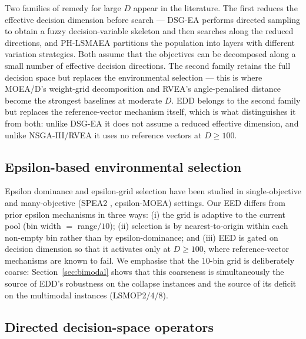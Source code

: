 \documentclass[preprint,12pt]{elsarticle}
\begin{document}
Two families of remedy for large $D$ appear in the literature. The first
reduces the effective decision dimension before search --- DSG-EA
\cite{zou2024two} performs directed sampling to obtain a fuzzy
decision-variable skeleton and then searches along the reduced directions,
and PH-LSMAEA \cite{wang2024population} partitions the population into layers
with different variation strategies. Both assume that the objectives can be
decomposed along a small number of effective decision directions. The second
family retains the full decision space but replaces the environmental
selection --- this is where MOEA/D's weight-grid decomposition
\cite{qingfuzhang2007moead} and RVEA's angle-penalised distance
\cite{cheng2016a} become the strongest baselines at moderate $D$. EDD belongs
to the second family but replaces the reference-vector mechanism itself,
which is what distinguishes it from both: unlike DSG-EA \cite{zou2024two} it
does not assume a reduced effective dimension, and unlike NSGA-III/RVEA it
uses no reference vectors at $D \ge 100$.

\subsection{Epsilon-based environmental selection}

Epsilon dominance and epsilon-grid selection have been studied in
single-objective \cite{deb2005evaluating} and many-objective
(SPEA2 \cite{zitzler2001spea2}, epsilon-MOEA) settings. Our EED differs
from prior epsilon mechanisms in three ways: (i) the grid is adaptive to
the current pool (bin width $=$ range$/10$); (ii) selection is by
nearest-to-origin within each non-empty bin rather than by
epsilon-dominance; and (iii) EED is gated on decision dimension so that it
activates only at $D \geq 100$, where reference-vector mechanisms are known
to fail. We emphasise that the 10-bin grid is deliberately coarse:
Section~\ref{sec:bimodal} shows that this coarseness is simultaneously the
source of EDD's robustness on the collapse instances and the source of its
deficit on the multimodal instances (LSMOP2/4/8).

\subsection{Directed decision-space operators}
\end{document}
